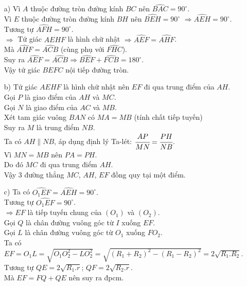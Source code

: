 \begin{ex}
{\begin{center}
	\end{center}
	\begin{enumerate}
		\item[a)]
		Vì $ A $  thuộc đường tròn đường kính $ BC $ nên $ \widehat{BAC}=90^\circ. $
		\\Vì $ E $  thuộc đường tròn đường kính $ BH $ nên $ \widehat{BEH}=90^\circ $ $\Rightarrow \widehat{AEH}=90^\circ.$
		\\ Tương tự $ \widehat{AFH}=90^\circ. $
		\\$ \Rightarrow $ Tứ giác $ AEHF $ là hình chữ nhật $ \Rightarrow \widehat{AEF}=\widehat{AHF} $.
		\\ Mà $ \widehat{AHF}=\widehat{ACB} $ (cùng phụ với $ \widehat{FHC} $).
		\\ Suy ra $ \widehat{AEF}=\widehat{ACB}  \Rightarrow \widehat{BEF}+\widehat{FCB}=180^\circ$.
		\\ Vậy tứ giác $ BEFC $ nội tiếp đường tròn.
		\item[b)] Tứ giác $ AEHF $ là hình chữ nhật nên $ EF $ đi qua trung điểm của $ AH $.
		\\Gọi $ P $ là giao điểm của $ AH $ và $ MC $.
		\\Gọi $ N $ là giao điểm của $ AC $ và $ MB $.
		\\Xét tam giác vuông $ BAN $ có $ MA=MB $ (tính chất tiếp tuyến) 
		\\ Suy ra $ M $ là trung điểm $ NB $.
		\\Ta có $ AH \parallel NB $, áp dụng định lý Ta-lét: $ \cfrac{AP}{MN}=\cfrac{PH}{NB} $.
		\\Vì $ MN=MB $ nên $ PA=PH $.
		\\ Do đó $ MC $ đi qua trung điểm $ AH $.
		\\ Vậy 3 đường thẳng $ MC $, $ AH $, $ EF $ đồng quy tại một điểm.
		\item[c)]
		Ta có $ \widehat{O_1EF}=\widehat{AEH}=90^\circ. $
		\\Tương tự  $ \widehat{O_1EF}=90^\circ$.
		\\ $ \Rightarrow EF $ là tiếp tuyến chung của $ (O_1) $ và $ (O_2) $.
		\\ Gọi $ Q $ là chân đường vuông góc từ $ I $ xuống $ EF $.
		\\ Gọi $ L $ là chân đường vuông góc từ $ O_1 $ xuống $ FO_2 $.
		\\ Ta có $ EF=O_1L=\sqrt{O_1O_2^2-LO_2^2}=\sqrt{\left( R_1+R_2\right)^2-\left( R_1-R_2\right)^2}=2\sqrt{R_1.R_2}. $
		\\Tương tự $ QE=2\sqrt{R_1.r}$; $ QF=2\sqrt{R_2.r} $.
		\\Mà $ EF=FQ+QE $ nên suy ra đpcm.
	\end{enumerate}
}
\end{ex}


